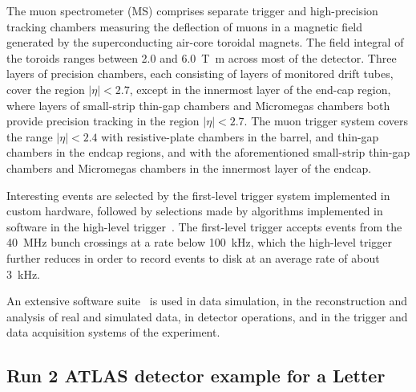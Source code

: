 The muon spectrometer (MS) comprises separate trigger and
high-precision tracking chambers measuring the deflection of muons in a magnetic field generated by the superconducting air-core toroidal magnets.
The field integral of the toroids ranges between \num{2.0} and \qty{6.0}{\tesla\metre}
across most of the detector. 
Three layers of precision chambers, each consisting of layers of monitored drift tubes, cover the region \(|\eta| < 2.7\),
except in the innermost layer of the end-cap region, where layers of small-strip thin-gap chambers and Micromegas chambers both provide precision tracking in the region \(|\eta| < 2.7\).
The muon trigger system covers the range \(|\eta| < 2.4\) with resistive-plate chambers in the barrel, and thin-gap chambers in the endcap regions, and with the aforementioned small-strip thin-gap chambers and Micromegas chambers in the innermost layer of the endcap.

Interesting events are selected by the first-level trigger system implemented in custom hardware,
followed by selections made by algorithms implemented in software in the high-level trigger~\cite{TRIG-2016-01}. 
The first-level trigger accepts events from the \qty{40}{\MHz} bunch crossings at a rate below \qty{100}{\kHz},
which the high-level trigger further reduces in order to record events to disk at an average rate of about \qty{3}{\kHz}.

An extensive software suite~\cite{ATL-SOFT-PUB-2021-001} is used in data simulation, in the reconstruction
and analysis of real and simulated data, in detector operations, and in the trigger and data acquisition
systems of the experiment.

\subsection{Run 2 ATLAS detector example for a Letter}
\label{sec:atlas2a}

